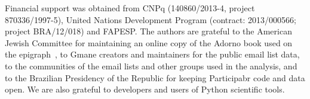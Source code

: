 \documentclass[%
	aip,
	jmp,%
	amsmath,amssymb,
	reprint,%
]{revtex4-1}
\begin{document}

\begin{acknowledgments}
	Financial support was obtained from CNPq (140860/2013-4,
	project 870336/1997-5), United Nations Development Program (contract: 2013/000566; project BRA/12/018) and FAPESP. 
	The authors are grateful to the American Jewish Committee for maintaining an online copy of the Adorno book used on the epigraph~\cite{adorno}, to Gmane creators and maintainers for the public email list data, to the communities of the email lists and other groups used in the analysis, and to the Brazilian Presidency of the Republic for keeping Participabr code and data open.
	We are also grateful to developers and users of Python scientific tools.
\end{acknowledgments}
\end{document}
